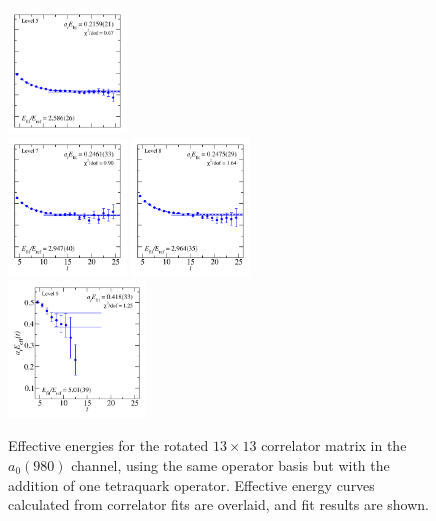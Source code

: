 \begin{figure}
  \includegraphics[width=0.28\textwidth]{figures/spectrum_a1gm/with_tq/fits/fit_5.pdf}\\
  \includegraphics[width=0.28\textwidth]{figures/spectrum_a1gm/with_tq/fits/fit_7.pdf}
  \includegraphics[width=0.28\textwidth]{figures/spectrum_a1gm/with_tq/fits/fit_8.pdf}\\[-0.4cm]
  \includegraphics[width=0.325\textwidth]{figures/spectrum_a1gm/with_tq/fits/fit_9.pdf}
  \caption{Effective energies for the rotated $13\times 13$ correlator matrix in the $a_0(980)$ channel, using the same operator basis but with the addition of one tetraquark operator. Effective energy curves calculated from correlator fits are overlaid, and fit results are shown.}
  \label{fig:a0_with_tq_grid}
\end{figure}

